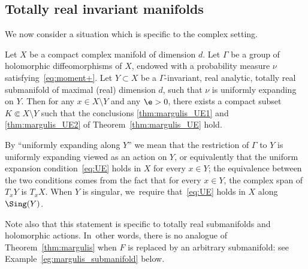 \subsection{Totally real invariant manifolds}
We now consider a situation which is specific to the complex setting.

\begin{thm}\label{thm:margulis_totalement_reel}
Let $X$ be a compact complex manifold of dimension $d$. Let $\Gamma$ be a group of holomorphic diffeomorphisms of $X$,
endowed with a probability measure $\nu$ satisfying~\eqref{eq:moment+}. Let $Y\subset X$
be a $\Gamma$-invariant,
real analytic, totally real submanifold of maximal (real) dimension $d$, such that
$\nu$ is uniformly expanding on $Y$.
Then for any
$x\in X\setminus Y$ and any $\e>0$, there exists a compact subset $K\Subset X\setminus Y$ such that the
conclusions \eqref{thm:margulis_UE1} and \eqref{thm:margulis_UE2} of Theorem~\ref{thm:margulis_UE} hold.
\end{thm}

By ``uniformly expanding along $Y$'' we mean that the restriction of $\Gamma$ to $Y$ is
uniformly expanding viewed as an action on $Y$, or equivalently
that the uniform expansion condition~\eqref{eq:UE} holds in $X$ for every $x\in Y$; the equivalence between the two conditions comes from the fact that for every $x\in Y$, the
complex span of $T_xY$ is $T_xX$. When $Y$ is singular, we~require that~\eqref{eq:UE} holds in $X$ along
$\Sing(Y)$.

Note also that this statement is specific to totally real submanifolds and holomorphic actions. In~other words,
there is no analogue of Theorem~\ref{thm:margulis} when $F$ is replaced by an arbitrary submanifold:
see Example~\ref{eg:margulis_submanifold} below.


